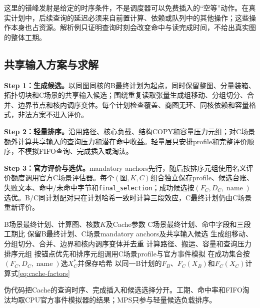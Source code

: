 这里的错峰发射是给定的时序条件，不是调度器可以免费插入的“空等”动作。在真实计划中，后续查询的延迟必须来自前置计算、依赖或队列中的其他操作；这些操作本身也占资源。解析例只证明查询时刻会改变命中与读完成时间，不给出真实图的整体工期。

\subsection{共享输入方案与求解}
\textbf{Step 1：生成候选。}以同图同核的B最终计划为起点，同时保留整图、分量装箱、拓扑切块和C场景的共享输入候选；围绕重复读取张量生成组移动、分组切分、合并、边界节点和核内调序变体。每个计划检查覆盖、商图无环、同核依赖和容量格式，非法方案不进入评价。

\textbf{Step 2：轻量排序。}沿用路径、核心负载、结构COPY和容量压力元组；对C场景额外计算共享输入的查询压力和潜在命中收益。轻量层只安排profile和完整评价顺序，不模拟FIFO查询、完成插入或淘汰。

\textbf{Step 3：官方评价与选优。}mandatory anchors先行，随后按排序元组使用名义评价额度调用官方C场景评估器。每个$(\text{图},K,C)$组合独立保存profile、候选台账、失败文本、命中/未命中字节和\texttt{final\_selection}；成功候选按$(F_C,D_C,\operatorname{name})$选优。B/C同计划配对只在计划哈希一致时计算三段效应，C最终计划仍由C场景重新评价。

\begin{algorithm}[H]\caption{问题三FIFO候选选择与同计划对照}\label{alg:c-select}
\begin{algorithmic}[1]
\REQUIRE B场景最终计划、计算图、核数$K$及Cache参数
\ENSURE C场景最终计划、命中字段和三段工期比
\STATE 保留B最终计划、C场景mandatory anchors及共享输入候选
\STATE 生成组移动、分组切分、合并、边界和核内调序变体并去重
\STATE 计算路径、搬运、容量和查询压力排序元组
\STATE 按锚点优先和排序元组调用C场景profile与官方事件模拟
\STATE 在成功集合按$(F_C,D_C,\operatorname{name})$选$X_C^*$并保存哈希
\STATE 以同一B计划的$F_B$、$F_C(X_B)$和$F_C(X_C)$计算式\eqref{eq:cache-factors}
\end{algorithmic}\end{algorithm}

伪代码把Cache的查询时序、完成插入和候选选择分开。工期、命中率和FIFO淘汰均取CPU官方事件模拟器的结果；MPS只参与轻量候选负载排序。

